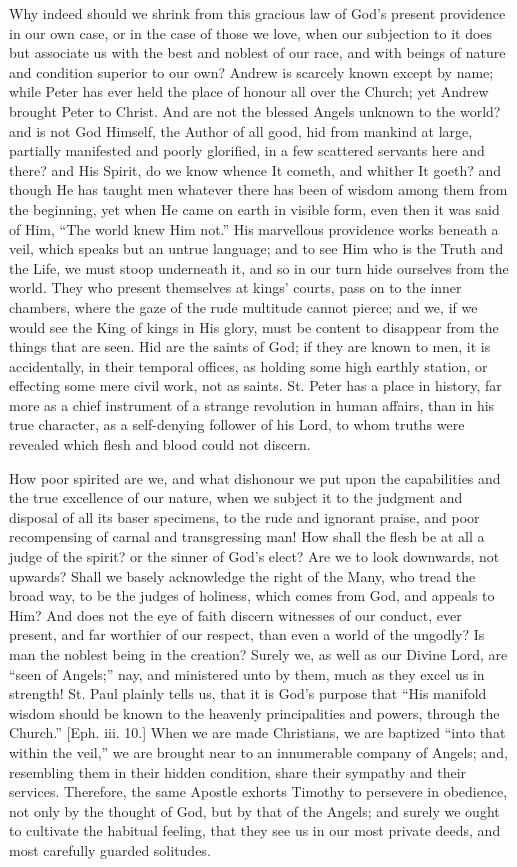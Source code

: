Why indeed should we shrink from this gracious law of God's present
providence in our own case, or in the case of those we love, when our
subjection to it does but associate us with the best and noblest of
our race, and with beings of nature and condition superior to our own?
Andrew is scarcely known except by name; while Peter has ever held the
place of honour all over the Church; yet Andrew brought Peter to
Christ. And are not the blessed Angels unknown to the world? and is
not God Himself, the Author of all good, hid from mankind at large,
partially manifested and poorly glorified, in a few scattered servants
here and there? and His Spirit, do we know whence It cometh, and
whither It goeth? and though He has taught men whatever there has been
of wisdom among them from the beginning, yet when He came on earth in
visible form, even then it was said of Him, ``The world knew Him
not.'' His marvellous providence works beneath a veil, which
speaks but an untrue language; and to see Him who is the Truth and the
Life, we must stoop underneath it, and so in our turn hide ourselves
from the world. They who present themselves at kings' courts, pass on
to the inner chambers, where the gaze of the rude multitude cannot
pierce; and we, if we would see the King of kings in His glory, must
be content to disappear from the things that are seen. Hid are the
saints of God; if they are known to men, it is accidentally, in their
temporal offices, as holding some high earthly station, or effecting
some mere civil work, not as saints. St. Peter has a place in history,
far more as a chief instrument of a strange revolution in human
affairs, than in his true character, as a self-denying follower of his
Lord, to whom truths were revealed which flesh and blood could not
discern.

How poor spirited are we, and what dishonour we put upon the
capabilities and the true excellence of our nature, when we subject it
to the judgment and disposal of all its baser specimens, to the rude
and ignorant praise, and poor recompensing of carnal and transgressing
man! How shall the flesh be at all a judge of the spirit? or the
sinner of God's elect? Are we to look downwards, not upwards? Shall we
basely acknowledge the right of the Many, who tread the broad way, to
be the judges of holiness, which comes from God, and appeals to Him?
And does not the eye of faith discern witnesses of our conduct, ever
present, and far worthier of our respect, than even a world of the
ungodly? Is man the noblest being in the creation? Surely we, as well
as our Divine Lord, are ``seen of Angels;'' nay, and
ministered unto by them, much as they excel us in strength! St. Paul
plainly tells us, that it is God's purpose that ``His manifold
wisdom should be known to the heavenly principalities and powers,
through the Church.'' [Eph. iii. 10.] When we are made Christians,
we are baptized ``into that within the veil,'' we are brought
near to an innumerable company of Angels; and, resembling them in
their hidden condition, share their sympathy and their services.
Therefore, the same Apostle exhorts Timothy to persevere in obedience,
not only by the thought of God, but by that of the Angels; and surely
we ought to cultivate the habitual feeling, that they see us in our
most private deeds, and most carefully guarded solitudes.

